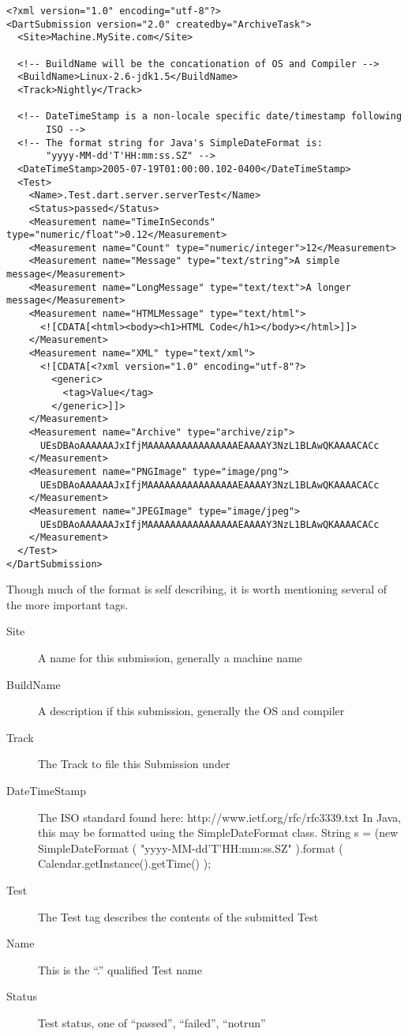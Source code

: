 \documentclass{InsightBook}
\begin{document}
\begin{verbatim}
<?xml version="1.0" encoding="utf-8"?>
<DartSubmission version="2.0" createdby="ArchiveTask">
  <Site>Machine.MySite.com</Site>
  
  <!-- BuildName will be the concationation of OS and Compiler -->
  <BuildName>Linux-2.6-jdk1.5</BuildName>
  <Track>Nightly</Track>
  
  <!-- DateTimeStamp is a non-locale specific date/timestamp following
       ISO -->
  <!-- The format string for Java's SimpleDateFormat is:
       "yyyy-MM-dd'T'HH:mm:ss.SZ" -->
  <DateTimeStamp>2005-07-19T01:00:00.102-0400</DateTimeStamp>
  <Test>
    <Name>.Test.dart.server.serverTest</Name>
    <Status>passed</Status>
    <Measurement name="TimeInSeconds" type="numeric/float">0.12</Measurement>
    <Measurement name="Count" type="numeric/integer">12</Measurement>
    <Measurement name="Message" type="text/string">A simple message</Measurement>
    <Measurement name="LongMessage" type="text/text">A longer message</Measurement>
    <Measurement name="HTMLMessage" type="text/html">
      <![CDATA[<html><body><h1>HTML Code</h1></body></html>]]>
    </Measurement>
    <Measurement name="XML" type="text/xml">
      <![CDATA[<?xml version="1.0" encoding="utf-8"?>
        <generic>
          <tag>Value</tag>
        </generic>]]>
    </Measurement>
    <Measurement name="Archive" type="archive/zip">
      UEsDBAoAAAAAAJxIfjMAAAAAAAAAAAAAAAAEAAAAY3NzL1BLAwQKAAAACACc
    </Measurement>
    <Measurement name="PNGImage" type="image/png">
      UEsDBAoAAAAAAJxIfjMAAAAAAAAAAAAAAAAEAAAAY3NzL1BLAwQKAAAACACc
    </Measurement>
    <Measurement name="JPEGImage" type="image/jpeg">
      UEsDBAoAAAAAAJxIfjMAAAAAAAAAAAAAAAAEAAAAY3NzL1BLAwQKAAAACACc
    </Measurement>
  </Test>
</DartSubmission>
\end{verbatim}

Though much of the format is self describing, it is worth mentioning
several of the more important tags.

\begin{description}
  \item[Site]{A name for this submission, generally a machine name}
  \item[BuildName]{A description if this submission, generally the OS
and compiler}
  \item[Track]{The Track to file this Submission under}
  \item[DateTimeStamp]{The ISO standard found here:
http://www.ietf.org/rfc/rfc3339.txt  In Java, this may be formatted
using the SimpleDateFormat class.  String s = (new
SimpleDateFormat ( "yyyy-MM-dd'T'HH:mm:ss.SZ" ).format (
Calendar.getInstance().getTime() );}
  \item[Test]{The Test tag describes the contents of the submitted
Test}
  \item[Name]{This is the ``.'' qualified Test name}
  \item[Status]{Test status, one of ``passed'', ``failed'',
``notrun''}
\end{description}
\end{document}
